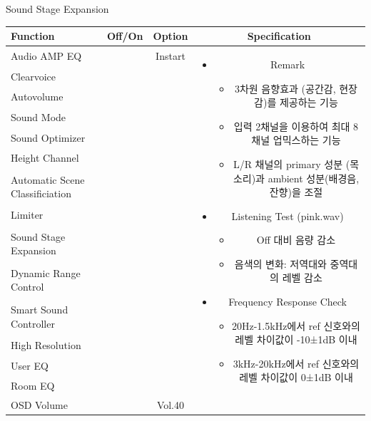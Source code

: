 \documentclass{beamer}
\begin{document}
\begin{frame}[t]{Sound Stage Expansion}
\begin{tiny}
\begin{tabular}{@{}lccc@{}}
\toprule
Function & Off/On & Option & Specification \\
\midrule
Audio AMP EQ & \color{black}{Off} & Instart &
\multirow{14}{60mm}{
\begin{itemize}
\item Remark
	\begin{itemize}
	\item 3차원 음향효과 (공간감, 현장감)를 제공하는 기능
	\item 입력 2채널을 이용하여 최대 8채널 업믹스하는 기능
	\item L/R 채널의 primary 성분 (목소리)과 ambient 성분(배경음, 잔향)을 조절
	\end{itemize}
\item Listening Test (pink.wav)
	\begin{itemize}
	\item Off 대비 음량 감소
	\item 음색의 변화: 저역대와 중역대의 레벨 감소
	\end{itemize}
\item Frequency Response Check
  \begin{itemize}
  \item 20Hz-1.5kHz에서 ref 신호와의 레벨 차이값이 -10±1dB 이내
  \item 3kHz-20kHz에서 ref 신호와의 레벨 차이값이 0±1dB 이내
  \end{itemize}
\end{itemize}
} \\
Clearvoice & \color{black}{Off} & & \\
Autovolume & \color{black}{Off} & & \\
Sound Mode & \color{black}{Off} & & \\
Sound Optimizer & \color{black}{Off} & & \\
Height Channel & \color{black}{Off} & & \\
Automatic Scene Classificiation & \color{black}{Off} & & \\
Limiter & \color{black}{Off} & & \\
Sound Stage Expansion & \color{blue}{On} & & \\
Dynamic Range Control & \color{black}{Off} & & \\
Smart Sound Controller & \color{black}{Off} & & \\
High Resolution & \color{black}{Off} & & \\
User EQ & \color{black}{Off} & & \\
Room EQ & \color{black}{Off} & & \\
OSD Volume & \color{blue}{On} & Vol.40 & \\
\midrule
\end{tabular}
\end{tiny}


\end{frame}
\end{document}
